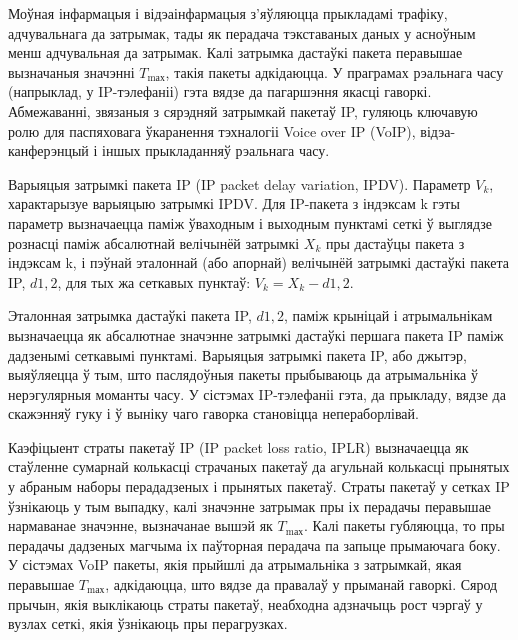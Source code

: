 Моўная інфармацыя і відэаінфармацыя з'яўляюцца прыкладамі трафіку, адчувальнага да затрымак, тады як перадача тэкставаных даных у асноўным менш адчувальная да затрымак. Калі затрымка дастаўкі пакета перавышае вызначаныя значэнні $T_\text{mах}$, такія пакеты адкідаюцца. У праграмах рэальнага часу (напрыклад, у IP-тэлефаніі) гэта вядзе да пагаршэння якасці гаворкі. Абмежаванні, звязаныя з сярэдняй затрымкай пакетаў IP, гуляюць ключавую ролю для паспяховага ўкаранення тэхналогіі Voice over IP (VoIP), відэа-канферэнцый і іншых прыкладанняў рэальнага часу.

Варыяцыя затрымкі пакета IP (IP packet delay variation, IPDV). Параметр $V_k$, характарызуе варыяцыю затрымкі IPDV. Для IP-пакета з індэксам k гэты параметр вызначаецца паміж ўваходным і выходным пунктамі сеткі ў выглядзе рознасці паміж абсалютнай велічынёй затрымкі $X_k$ пры дастаўцы пакета з індэксам k, і пэўнай эталоннай (або апорнай) велічынёй затрымкі дастаўкі пакета IP, $d1{,}2$, для тых жа сеткавых пунктаў: $V_k = X_k - d1{,}2$.

Эталонная затрымка дастаўкі пакета IP, $d1{,}2$, паміж крыніцай і атрымальнікам вызначаецца як абсалютнае значэнне затрымкі дастаўкі першага пакета IP паміж дадзенымі сеткавымі пунктамі. Варыяцыя затрымкі пакета IP, або джытэр, выяўляецца ў тым, што паслядоўныя пакеты прыбываюць да атрымальніка ў нерэгулярныя моманты часу. У сістэмах IP-тэлефаніі гэта, да прыкладу, вядзе да скажэнняў гуку і ў выніку чаго гаворка становіцца непераборлівай.

Каэфіцыент страты пакетаў IP (IP packet loss ratio, IPLR) вызначаецца як стаўленне сумарнай колькасці страчаных пакетаў да агульнай колькасці прынятых у абраным наборы перададзеных і прынятых пакетаў. Страты пакетаў у сетках IP ўзнікаюць у тым выпадку, калі значэнне затрымак пры іх перадачы перавышае нармаванае значэнне, вызначанае вышэй як $T_\text{mах}$. Калі пакеты губляюцца, то пры перадачы дадзеных магчыма іх паўторная перадача па запыце прымаючага боку. У сістэмах VoIP пакеты, якія прыйшлі да атрымальніка з затрымкай, якая перавышае $T_\text{mах}$, адкідаюцца, што вядзе да правалаў у прыманай гаворкі. Сярод прычын, якія выклікаюць страты пакетаў, неабходна адзначыць рост чэргаў у вузлах сеткі, якія ўзнікаюць пры перагрузках.

